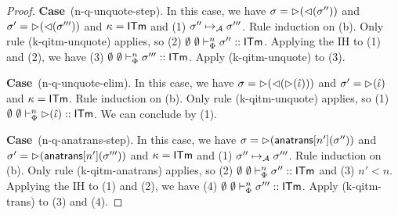 \documentclass[12pt]{article}
\newcommand{\pfcase}[1]{\textbf{Case}~#1. }
\begin{document}
\begin{proof}




\pfcase{(n-q-unquote-step)} In this case, we have $\sigma={\rhd}({\lhd}(\sigma''))$ and $\sigma'={\rhd}({\lhd}(\sigma'''))$ and $\kappa={\sf ITm}$ and (1) $\sigma'' \mapsto_{\mathcal{A}} \sigma'''$. Rule induction on (b). Only rule (k-qitm-unquote) applies, so (2) $\emptyset~\emptyset \vdash_{\Phi}^{n} \sigma'' :: {\sf ITm}$. Applying the IH to (1) and (2), we have (3) $\emptyset~\emptyset \vdash_{\Phi}^{n} \sigma''' :: {\sf ITm}$. Apply (k-qitm-unquote) to (3).

\pfcase{(n-q-unquote-elim)} In this case, we have $\sigma={\rhd}({\lhd}({\rhd}(\hat{\iota})))$ and $\sigma'={\rhd}(\hat{\iota})$ and $\kappa={\sf ITm}$. Rule induction on (b). Only rule (k-qitm-unquote) applies, so (1) $\emptyset~\emptyset \vdash_{\Phi}^{n} {\rhd}(\hat{\iota}) :: {\sf ITm}$. We can conclude by (1).

\pfcase{(n-q-anatrans-step)} In this case, we have $\sigma={\rhd}({\sf anatrans}[n'](\sigma''))$ and $\sigma'={\rhd}({\sf anatrans}[n'](\sigma'''))$ and $\kappa={\sf ITm}$ and (1) $\sigma'' \mapsto_{\mathcal{A}} \sigma'''$. Rule induction on (b). Only rule (k-qitm-anatrans) applies, so (2) $\emptyset~\emptyset \vdash_{\Phi}^{n} \sigma'' :: {\sf ITm}$ and (3) $n' < n$. Applying the IH to (1) and (2), we have (4) $\emptyset~\emptyset \vdash_{\Phi}^{n} \sigma''' :: {\sf ITm}$. Apply (k-qitm-trans) to (3) and (4).


\end{proof}
\end{document}
